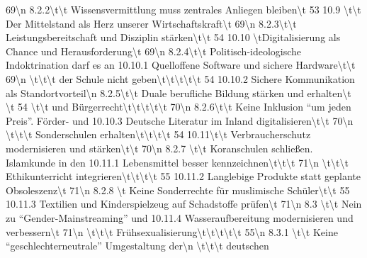 \documentclass[12pt,]{book}
\makeatletter
\newenvironment{Shaded}{\begin{snugshade}}{\end{snugshade}}
\newenvironment{kframe}{%
\medskip{}
\setlength{\fboxsep}{.8em}
 \def\at@end@of@kframe{}%
 \ifinner\ifhmode%
  \def\at@end@of@kframe{\end{minipage}}%
  \begin{minipage}{\columnwidth}%
 \fi\fi%
 \def\FrameCommand##1{\hskip\@totalleftmargin \hskip-\fboxsep
 \colorbox{shadecolor}{##1}\hskip-\fboxsep
     \hskip-\linewidth \hskip-\@totalleftmargin \hskip\columnwidth}%
 \MakeFramed {\advance\hsize-\width
   \@totalleftmargin\z@ \linewidth\hsize
   \@setminipage}}%
 {\par\unskip\endMakeFramed%
 \at@end@of@kframe}
\renewenvironment{Shaded}{\begin{kframe}}{\end{kframe}}
\makeatother
\begin{document}
\begin{Shaded}
\begin{Highlighting}[]
69\textbackslash{}n     8.2.2\textbackslash{}t\textbackslash{}t Wissensvermittlung muss zentrales Anliegen bleiben\textbackslash{}t           53   10.9 \textbackslash{}t\textbackslash{}t Der Mittelstand als Herz unserer Wirtschaftskraft\textbackslash{}t    69\textbackslash{}n     8.2.3\textbackslash{}t\textbackslash{}t Leistungsbereitschaft und Disziplin stärken\textbackslash{}t\textbackslash{}t                 54   10.10 \textbackslash{}tDigitalisierung als Chance und Herausforderung\textbackslash{}t        69\textbackslash{}n     8.2.4\textbackslash{}t\textbackslash{}t Politisch-ideologische Indoktrination darf es an                   10.10.1 Quelloffene Software und sichere Hardware\textbackslash{}t\textbackslash{}t           69\textbackslash{}n   \textbackslash{}t\textbackslash{}t\textbackslash{}t der Schule nicht geben\textbackslash{}t\textbackslash{}t\textbackslash{}t\textbackslash{}t\textbackslash{}t                                         54   10.10.2 Sichere Kommunikation als Standortvorteil\textbackslash{}n     8.2.5\textbackslash{}t\textbackslash{}t Duale berufliche Bildung stärken und erhalten\textbackslash{}t \textbackslash{}t              54 \textbackslash{}t\textbackslash{}t          und Bürgerrecht\textbackslash{}t\textbackslash{}t\textbackslash{}t\textbackslash{}t\textbackslash{}t                                70\textbackslash{}n     8.2.6\textbackslash{}t\textbackslash{}t Keine Inklusion “um jeden Preis”. Förder- und                      10.10.3 Deutsche Literatur im Inland digitalisieren\textbackslash{}t\textbackslash{}t         70\textbackslash{}n     \textbackslash{}t\textbackslash{}t\textbackslash{}t      Sonderschulen erhalten\textbackslash{}t\textbackslash{}t\textbackslash{}t\textbackslash{}t                                   54   10.11\textbackslash{}t\textbackslash{}t Verbraucherschutz modernisieren und stärken\textbackslash{}t\textbackslash{}t         70\textbackslash{}n     8.2.7 \textbackslash{}t\textbackslash{}t Koranschulen schließen. Islamkunde in den                         10.11.1 Lebensmittel besser kennzeichnen\textbackslash{}t\textbackslash{}t\textbackslash{}t                   71\textbackslash{}n     \textbackslash{}t\textbackslash{}t\textbackslash{}t      Ethikunterricht integrieren\textbackslash{}t\textbackslash{}t\textbackslash{}t\textbackslash{}t                              55   10.11.2 Langlebige Produkte statt geplante Obsoleszenz\textbackslash{}t       71\textbackslash{}n     8.2.8 \textbackslash{}t Keine Sonderrechte für muslimische Schüler\textbackslash{}t\textbackslash{}t                  55   10.11.3 Textilien und Kinderspielzeug auf Schadstoffe prüfen\textbackslash{}t 71\textbackslash{}n     8.3 \textbackslash{}t\textbackslash{}t Nein zu “Gender-Mainstreaming” und                                  10.11.4 Wasseraufbereitung modernisieren und verbessern\textbackslash{}t      71\textbackslash{}n   \textbackslash{}t\textbackslash{}t\textbackslash{}t        Frühsexualisierung\textbackslash{}t\textbackslash{}t\textbackslash{}t\textbackslash{}t\textbackslash{}t                                      55\textbackslash{}n     8.3.1 \textbackslash{}t\textbackslash{}t Keine “geschlechterneutrale” Umgestaltung der\textbackslash{}n     \textbackslash{}t\textbackslash{}t\textbackslash{}t      deutschen 
\end{Highlighting}
\end{Shaded}
\end{document}
